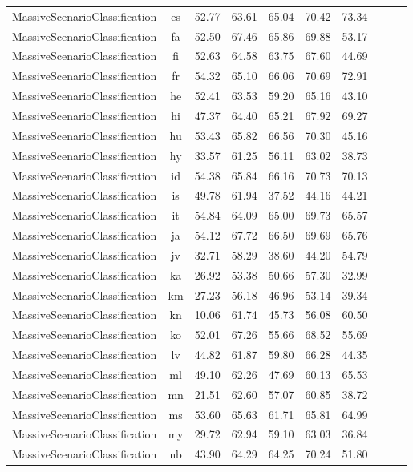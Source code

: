 \documentclass[11pt]{article}
\begin{document}
\begin{table*}[t!]
{\begin{tabular}{lc|cccccccc}
MassiveScenarioClassification & es & 52.77 & 63.61 & 65.04 & 70.42 & 73.34 \\
MassiveScenarioClassification & fa & 52.50 & 67.46 & 65.86 & 69.88 & 53.17 \\
MassiveScenarioClassification & fi & 52.63 & 64.58 & 63.75 & 67.60 & 44.69 \\
MassiveScenarioClassification & fr & 54.32 & 65.10 & 66.06 & 70.69 & 72.91 \\
MassiveScenarioClassification & he & 52.41 & 63.53 & 59.20 & 65.16 & 43.10 \\
MassiveScenarioClassification & hi & 47.37 & 64.40 & 65.21 & 67.92 & 69.27 \\
MassiveScenarioClassification & hu & 53.43 & 65.82 & 66.56 & 70.30 & 45.16 \\
MassiveScenarioClassification & hy & 33.57 & 61.25 & 56.11 & 63.02 & 38.73 \\
MassiveScenarioClassification & id & 54.38 & 65.84 & 66.16 & 70.73 & 70.13 \\
MassiveScenarioClassification & is & 49.78 & 61.94 & 37.52 & 44.16 & 44.21 \\
MassiveScenarioClassification & it & 54.84 & 64.09 & 65.00 & 69.73 & 65.57 \\
MassiveScenarioClassification & ja & 54.12 & 67.72 & 66.50 & 69.69 & 65.76 \\
MassiveScenarioClassification & jv & 32.71 & 58.29 & 38.60 & 44.20 & 54.79 \\
MassiveScenarioClassification & ka & 26.92 & 53.38 & 50.66 & 57.30 & 32.99 \\
MassiveScenarioClassification & km & 27.23 & 56.18 & 46.96 & 53.14 & 39.34 \\
MassiveScenarioClassification & kn & 10.06 & 61.74 & 45.73 & 56.08 & 60.50 \\
MassiveScenarioClassification & ko & 52.01 & 67.26 & 55.66 & 68.52 & 55.69 \\
MassiveScenarioClassification & lv & 44.82 & 61.87 & 59.80 & 66.28 & 44.35 \\
MassiveScenarioClassification & ml & 49.10 & 62.26 & 47.69 & 60.13 & 65.53 \\
MassiveScenarioClassification & mn & 21.51 & 62.60 & 57.07 & 60.85 & 38.72 \\
MassiveScenarioClassification & ms & 53.60 & 65.63 & 61.71 & 65.81 & 64.99 \\
MassiveScenarioClassification & my & 29.72 & 62.94 & 59.10 & 63.03 & 36.84 \\
MassiveScenarioClassification & nb & 43.90 & 64.29 & 64.25 & 70.24 & 51.80 \\

\end{tabular}}
\end{table*}
\end{document}
